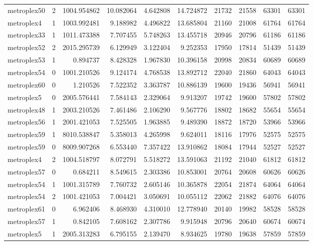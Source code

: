 \begin{longtable}{|l|r|r|r|r|r|r|r|r|r|}
metroplex50 & 2 & 1004.954862 & 10.082064 & 4.642808 & 14.724872 & 21732 & 21558 & 63301 & 63301 \\
metroplex4 & 1 & 1003.992481 & 9.188982 & 4.496822 & 13.685804 & 21160 & 21008 & 61764 & 61764 \\
metroplex33 & 1 & 1011.473388 & 7.707455 & 5.748263 & 13.455718 & 20946 & 20796 & 61186 & 61186 \\
metroplex52 & 2 & 2015.295739 & 6.129949 & 3.122404 & 9.252353 & 17950 & 17814 & 51439 & 51439 \\
metroplex53 & 1 & 0.894737 & 8.428328 & 1.967830 & 10.396158 & 20998 & 20834 & 60689 & 60689 \\
metroplex54 & 0 & 1001.210526 & 9.124174 & 4.768538 & 13.892712 & 22040 & 21860 & 64043 & 64043 \\
metroplex60 & 0 & 1.210526 & 7.522352 & 3.363787 & 10.886139 & 19600 & 19436 & 56941 & 56941 \\
metroplex5 & 0 & 2005.576441 & 7.584143 & 2.329064 & 9.913207 & 19742 & 19600 & 57802 & 57802 \\
metroplex48 & 1 & 2003.210526 & 7.461486 & 2.106290 & 9.567776 & 18802 & 18682 & 55654 & 55654 \\
metroplex56 & 1 & 2001.421053 & 7.525505 & 1.963885 & 9.489390 & 18872 & 18720 & 53966 & 53966 \\
metroplex59 & 1 & 8010.538847 & 5.358013 & 4.265998 & 9.624011 & 18116 & 17976 & 52575 & 52575 \\
metroplex59 & 0 & 8009.907268 & 6.553440 & 7.357422 & 13.910862 & 18084 & 17944 & 52527 & 52527 \\
metroplex4 & 2 & 1004.518797 & 8.072791 & 5.518272 & 13.591063 & 21192 & 21040 & 61812 & 61812 \\
metroplex57 & 0 & 0.684211 & 8.549615 & 2.303386 & 10.853001 & 20764 & 20608 & 60626 & 60626 \\
metroplex54 & 1 & 1001.315789 & 7.760732 & 2.605146 & 10.365878 & 22054 & 21874 & 64064 & 64064 \\
metroplex54 & 2 & 1001.421053 & 7.004421 & 3.050691 & 10.055112 & 22062 & 21882 & 64076 & 64076 \\
metroplex61 & 0 & 6.962406 & 8.468930 & 4.310010 & 12.778940 & 20140 & 19982 & 58528 & 58528 \\
metroplex57 & 1 & 0.842105 & 7.608162 & 2.307786 & 9.915948 & 20796 & 20640 & 60674 & 60674 \\
metroplex5 & 1 & 2005.313283 & 6.795155 & 2.139470 & 8.934625 & 19780 & 19638 & 57859 & 57859 \\

\end{longtable}
